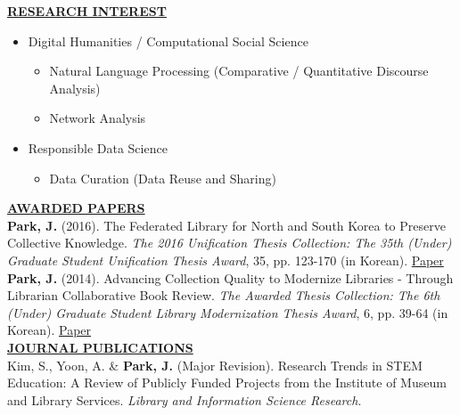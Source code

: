 \documentclass{article}
\begin{document}
\noindent \textbf{\underline{RESEARCH INTEREST}} 
\begin{itemize}[noitemsep,nolistsep,leftmargin=*]
\item {Digital Humanities / Computational Social Science}
\begin{itemize}
    \item {Natural Language Processing (Comparative / Quantitative Discourse Analysis)}
    \item {Network Analysis}
\end{itemize}
\item {Responsible Data Science}
    \begin{itemize}
        \item {Data Curation (Data Reuse and Sharing)}
    \end{itemize}
\end{itemize}

%
%
\noindent \textbf{\underline{AWARDED PAPERS}} \\
\noindent \textbf{Park, J.} (2016). The Federated Library for North and South Korea to Preserve Collective Knowledge. \textit{The 2016 Unification Thesis Collection: The 35th (Under) Graduate Student Unification Thesis Award}, 35, pp. 123-170 (in Korean). \hfill \href{https://uniedu.go.kr/uniedu/home/pds/pdsatcl/view.do?id=19773&mid=SM00000532&limit=20&sc=T&eqOdrby=false&eqViewYn=true&odr=news}{Paper}\\ 

\noindent \textbf{Park, J.} (2014). Advancing Collection Quality to Modernize Libraries - Through Librarian Collaborative Book Review. \textit{The Awarded Thesis Collection: The 6th (Under) Graduate Student Library Modernization Thesis Award}, 6, pp. 39-64 (in Korean). \hfill \href{https://oak.go.kr/nl-ir/handle/2020.oak/304}{Paper}\\

\noindent \textbf{\underline{JOURNAL PUBLICATIONS}} \\
\noindent Kim, S., Yoon, A. \& \textbf{Park, J.} (Major Revision). Research Trends in STEM Education: A Review of Publicly Funded Projects from the Institute of Museum and Library Services. \textit{Library and Information Science Research}. \\
\end{document}
